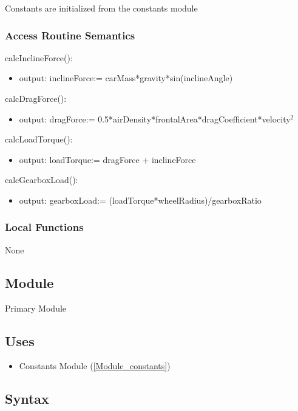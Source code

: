 \documentclass[12pt, titlepage]{article}
\begin{document}
Constants are initialized from the constants module

\subsubsection{Access Routine Semantics}

\noindent calcInclineForce():
\begin{itemize}
\item output: inclineForce:= carMass*gravity*sin(inclineAngle)
\end{itemize}

\noindent calcDragForce():
\begin{itemize}
\item output: dragForce:= 0.5*airDensity*frontalArea*dragCoefficient*velocity$^2$
\end{itemize}

\noindent calcLoadTorque():
\begin{itemize}
\item output: loadTorque:= dragForce + inclineForce
\end{itemize}

\noindent calcGearboxLoad():
\begin{itemize}
\item output: gearboxLoad:= (loadTorque*wheelRadius)/gearboxRatio 
\end{itemize}

\subsubsection{Local Functions}

None

\newpage
\subsection{Module}

Primary Module

\subsection{Uses}

\begin{itemize}
  \item Constants Module (\ref{Module_constants})
\end{itemize}

\subsection{Syntax}
\end{document}
